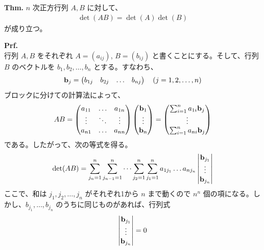 \documentclass[a4paper,11pt]{jsarticle}
\numberwithin{equation}{section}
\begin{document}
\begin{itembox}[l]{\textbf{Thm.}}
  $n$ 次正方行列 $A, B$ に対して、
  \begin{align}
      \det(AB) = \det(A) \det(B)
  \end{align}
  が成り立つ。
\end{itembox}
\textbf{Prf.}\\
 行列 $A, B$ をそれぞれ $A = (a_{ij})$, $B = (b_{ij})$ と書くことにする。そして、行列 $B$ のベクトルを $b_1, b_2, \dots, b_n$ とする。すなわち、
\begin{align}
  \vb{b}_j = 
  \begin{pmatrix}
      b_{1j} & b_{2j} & \dots & b_{nj}
  \end{pmatrix}
  \quad (j = 1, 2, \dots, n)
\end{align}
ブロックに分けての計算法によって、
\begin{align}
  AB =
  \begin{pmatrix}
      a_{11} & \dots & a_{1n} \\
      \vdots & \ddots & \vdots \\
      a_{n1} & \dots & a_{nn}
  \end{pmatrix}
  \begin{pmatrix}
      \vb{b}_{1} \\
      \vdots \\
      \vb{b}_{n}
  \end{pmatrix}
  =
  \begin{pmatrix}
      \sum_{i=1}^{n} a_{1i}\vb{b}_{j} \\
      \vdots \\
      \sum_{i=1}^{n} a_{ni}\vb{b}_{j}
  \end{pmatrix}
\end{align}
である。したがって、次の等式を得る。
\begin{align}
  \det(AB) = \sum_{j_n=1}^{n} \sum_{j_{n-1}=1}^{n} \dots \sum_{j_2 =1}^{n} \sum_{j_1 =1}^{n} a_{1j_1} \dots a_{nj_n} 
  \begin{vmatrix}
      \vb{b}_{j_1} \\
      \vdots \\
      \vb{b}_{j_n}
  \end{vmatrix}
\end{align}
ここで、和は $j_1, j_2, \dots, j_n$ がそれぞれ1から $n$ まで動くので $n^n$ 個の項になる。しかし、$b_{j_1}, \dots, b_{j_n}$ のうちに同じものがあれば、行列式
\begin{align}
  \begin{vmatrix}
      \vb{b}_{j_1} \\
      \vdots \\
      \vb{b}_{j_n}
  \end{vmatrix} = 0
\end{align}
\end{document}
